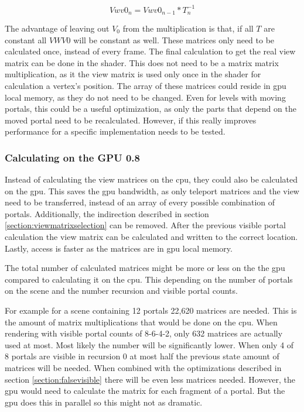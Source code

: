 $$Vwv0_n = Vwv0_{n-1} * T_n^{-1}$$

The advantage of leaving out $V_0$ from the multiplication is that, if all $T$ are constant all $VWV0$ will be constant as well. These matrices only need to be calculated once, instead of every frame. The final calculation to get the real view matrix can be done in the shader. This does not need to be a matrix matrix multiplication, as it the view matrix is used only once in the shader for calculation a vertex's position. The array of these matrices could reside in \gls{gpu} local memory, as they do not need to be changed. Even for levels with moving portals, this could be a useful optimization, as only the parts that depend on the moved portal need to be recalculated. However, if this really improves performance for a specific implementation needs to be tested.

\subsubsection{Calculating on the GPU 0.8}
Instead of calculating the view matrices on the \gls{cpu}, they could also be calculated on the \gls{gpu}.
This saves the \gls{gpu} bandwidth, as only teleport matrices and the view need to be transferred, instead of an array of every possible combination of portals. Additionally, the indirection described in section \ref{section:viewmatrixselection} can be removed. After the previous visible portal calculation the view matrix can be calculated and written to the correct location. Lastly, access is faster as the matrices are in \gls{gpu} local memory.

The total number of calculated matrices might be more or less on the the \gls{gpu} compared to calculating it on the \gls{cpu}. This  depending on the number of portals on the scene and the number recursion and visible portal counts. 

For example for a scene containing 12 portals 22,620 matrices are needed. This is the amount of matrix multiplications that would be done on the \gls{cpu}. When rendering with visible portal counts of 8-6-4-2, only 632 matrices are actually used at most. Most likely the number will be significantly lower. When only 4 of 8 portals are visible in recursion 0 at most half the previous state amount of matrices will be needed. When combined with the optimizations described in section \ref{section:falsevisible} there will be even less matrices needed. However, the \gls{gpu} would need to calculate the matrix for each fragment of a portal. But the \gls{gpu} does this in parallel so this might not as dramatic. 

